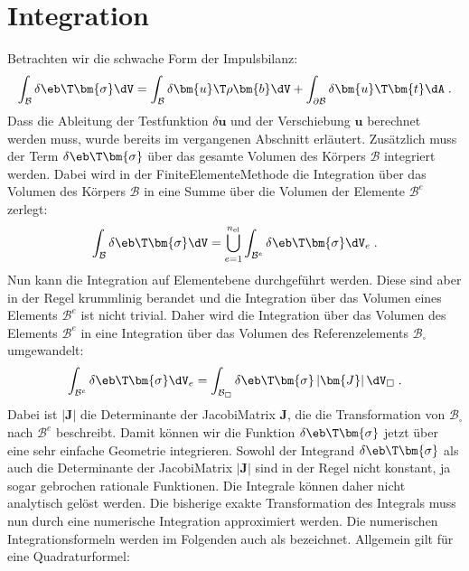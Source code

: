 \documentclass[letterpaper,10pt,german]{jupyterBook}
\begin{document}
\section{Integration}
\label{\detokenize{chapters/chapter3/Integration:integration}}\label{\detokenize{chapters/chapter3/Integration::doc}}
\sphinxAtStartPar
Betrachten wir die schwache Form der Impulsbilanz:
\begin{equation*}
\begin{split}\int_{\mathcal{B}} \delta\eb\T  \bm{\sigma} \dV = \int_{\mathcal{B}} \delta \bm{u}\T \rho \bm{b} \dV + \int_{\partial\mathcal{B}} \delta \bm{u}\T  \bm{t} \dA \; .\end{split}
\end{equation*}
\sphinxAtStartPar
Dass die Ableitung der Testfunktion \(\delta \bm{u}\) und der Verschiebung \(\bm{u}\) berechnet werden muss, wurde bereits im vergangenen Abschnitt erläutert. Zusätzlich muss der Term \(\delta\eb\T  \bm{\sigma}\) über das gesamte Volumen des Körpers \(\mathcal{B}\) integriert werden. Dabei wird in der Finite\sphinxhyphen{}Elemente\sphinxhyphen{}Methode die Integration über das Volumen des Körpers \(\mathcal{B}\) in eine Summe über die Volumen der Elemente \(\mathcal{B}^e\) zerlegt:
\begin{equation*}
\begin{split}\int_{\mathcal{B}} \delta\eb\T  \bm{\sigma} \dV = \bigcup_{e=1}^{n_{\text{el}}} \int_{\mathcal{B}^e} \delta\eb\T  \bm{\sigma} \dV_e \; .\end{split}
\end{equation*}
\sphinxAtStartPar
Nun kann die Integration auf Elementebene durchgeführt werden. Diese sind aber in der Regel krummlinig berandet und die Integration über das Volumen eines Elements \(\mathcal{B}^e\) ist nicht trivial. Daher wird die Integration über das Volumen des Elements \(\mathcal{B}^e\) in eine Integration über das Volumen des Referenzelements \(\mathcal{B}_{\square}\) umgewandelt:
\begin{equation*}
\begin{split}\int_{\mathcal{B}^e} \delta\eb\T  \bm{\sigma} \dV_e = \int_{\mathcal{B}_{\square}} \delta\eb\T  \bm{\sigma} \left| \bm{J} \right| \dV_{\square} \; .\end{split}
\end{equation*}
\sphinxAtStartPar
Dabei ist \(\left| \bm{J} \right|\) die Determinante der Jacobi\sphinxhyphen{}Matrix \(\bm{J}\), die die Transformation von \(\mathcal{B}_{\square}\) nach \(\mathcal{B}^e\) beschreibt. Damit können wir die Funktion \(\delta\eb\T  \bm{\sigma}\) jetzt über eine sehr einfache Geometrie integrieren. Sowohl der Integrand \(\delta\eb\T  \bm{\sigma}\) als auch die Determinante der Jacobi\sphinxhyphen{}Matrix \(\left| \bm{J} \right|\) sind in der Regel nicht konstant, ja sogar gebrochen rationale Funktionen. Die Integrale können daher nicht analytisch gelöst werden. Die bisherige exakte Transformation des Integrals muss nun durch eine numerische Integration approximiert werden. Die numerischen Integrationsformeln werden im Folgenden auch als  bezeichnet. Allgemein gilt für eine Quadraturformel:
\end{document}
